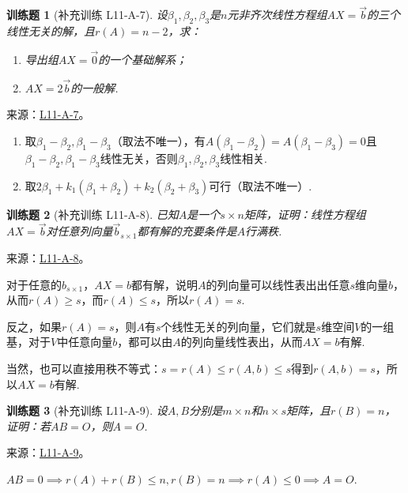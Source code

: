 \documentclass[12pt,fontset=fandol]{ctexart}
\newtheorem{exercise}{训练题}[section]
\begin{document}
\begin{exercise}[补充训练 L11-A-7]\label{prob:L11-A-7}
设$\beta_1,\beta_2,\beta_3$是$n$元非齐次线性方程组$AX=\vec{b}$的三个线性无关的解，且$r(A)=n-2$，求：
        \begin{enumerate}
            \item 导出组$AX=\vec{0}$的一个基础解系；

            \item $AX=2\vec{b}$的一般解.
        \end{enumerate}
\end{exercise}
\noindent 来源：\href{https://github.com/yhwu-is/Linear-Algebra-Left-Undone/blob/new/%E8%AE%B2%E4%B9%89/%E4%B8%93%E9%A2%98/11%20%E6%9C%9D%E8%8A%B1%E5%A4%95%E6%8B%BE.tex}{L11-A-7}。
\begin{solve}
\begin{enumerate}
                \item 取$\beta_1-\beta_2,\beta_1-\beta_3$（取法不唯一），有$A(\beta_1-\beta_2)=A(\beta_1-\beta_3)=0$且$\beta_1-\beta_2,\beta_1-\beta_3$线性无关，否则$\beta_1,\beta_2,\beta_3$线性相关.

                \item 取$2\beta_1+k_1(\beta_1+\beta_2)+k_2(\beta_2+\beta_3)$可行（取法不唯一）.
            \end{enumerate}
\end{solve}

\begin{exercise}[补充训练 L11-A-8]\label{prob:L11-A-8}
已知$A$是一个$s\times n$矩阵，证明：线性方程组$AX=\vec{b}$对任意列向量$\vec{b}_{s\times 1}$都有解的充要条件是$A$行满秩.
\end{exercise}
\noindent 来源：\href{https://github.com/yhwu-is/Linear-Algebra-Left-Undone/blob/new/%E8%AE%B2%E4%B9%89/%E4%B8%93%E9%A2%98/11%20%E6%9C%9D%E8%8A%B1%E5%A4%95%E6%8B%BE.tex}{L11-A-8}。
\begin{solve}
对于任意的$b_{s\times 1}$，$AX=b$都有解，说明$A$的列向量可以线性表出出任意$s$维向量$b$，从而$r(A)\geqslant s$，而$r(A)\leqslant s$，所以$r(A)=s$.

          反之，如果$r(A)=s$，则$A$有$s$个线性无关的列向量，它们就是$s$维空间$V$的一组基，对于$V$中任意向量$b$，都可以由$A$的列向量线性表出，从而$AX=b$有解.

          当然，也可以直接用秩不等式：$s=r(A)\leqslant r(A,b)\leqslant s$得到$r(A,b)=s$，所以$AX=b$有解.
\end{solve}

\begin{exercise}[补充训练 L11-A-9]\label{prob:L11-A-9}
设$A,B$分别是$m \times n$和$n \times s$矩阵，且$r(B)=n$，证明：若$AB=O$，则$A=O$.
\end{exercise}
\noindent 来源：\href{https://github.com/yhwu-is/Linear-Algebra-Left-Undone/blob/new/%E8%AE%B2%E4%B9%89/%E4%B8%93%E9%A2%98/11%20%E6%9C%9D%E8%8A%B1%E5%A4%95%E6%8B%BE.tex}{L11-A-9}。
\begin{solve}
$AB=0\implies r(A)+r(B)\leqslant n,r(B)=n\implies r(A)\leqslant 0\implies A=O$.
\end{solve}
\end{document}
